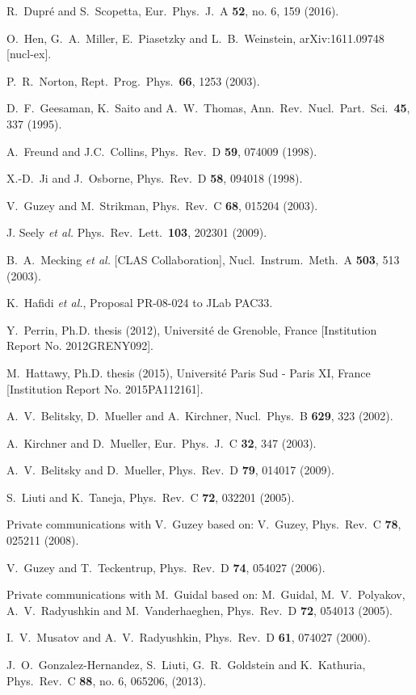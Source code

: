 \documentclass[twocolumn,nofootinbib,showpacs,prl,superscriptaddress,secnumarabic,amssymb,nobibnotes,aps,floatfix]{revtex4}
\begin{document}
\begin{thebibliography}{99}
  R.~Dupr\'e and S.~Scopetta,
  Eur.\ Phys.\ J.\ A {\bf 52}, no. 6, 159 (2016).

  O.~Hen, G.~A.~Miller, E.~Piasetzky and L.~B.~Weinstein,
  arXiv:1611.09748 [nucl-ex].

  P.~R.~Norton,
  Rept.\ Prog.\ Phys.\  {\bf 66}, 1253 (2003).

  D.~F.~Geesaman, K.~Saito and A.~W.~Thomas,
  Ann.\ Rev.\ Nucl.\ Part.\ Sci.\  {\bf 45}, 337 (1995).

A.~Freund and J.C.~Collins, 
Phys.\ Rev.\ D {\bf 59}, 074009 (1998).

X.-D.~Ji and J.~Osborne, 
Phys.\ Rev.\ D {\bf 58}, 094018 (1998).

  V.~Guzey and M.~Strikman,
  Phys.\ Rev.\ C {\bf 68}, 015204 (2003).

J. Seely {\it et al.} 
Phys.\ Rev.\ Lett.\ {\bf 103}, 202301 (2009).

B.~A.~Mecking {\it et al.} [CLAS Collaboration],
   Nucl.\ Instrum.\ Meth.\ A {\bf 503}, 513 (2003).

   K.~Hafidi {\it et al.},
   Proposal PR-08-024 to JLab PAC33.

Y.~Perrin, Ph.D. thesis (2012), Universit{\'e} de Grenoble, France
[Institution Report No. 2012GRENY092].

M.~Hattawy, Ph.D. thesis (2015), Universit{\'e} Paris Sud - Paris XI, France 
[Institution Report No. 2015PA112161].

A.~V.~Belitsky, D.~Mueller and A.~Kirchner,
Nucl.\ Phys.\ B {\bf 629}, 323 (2002).

A.~Kirchner and D.~Mueller, 
Eur.\ Phys.\ J.\ C {\bf 32}, 347 (2003).

A.~V.~Belitsky and D.~Mueller,
Phys.\ Rev.\ D {\bf 79}, 014017 (2009).

S.~Liuti and K.~Taneja, 
Phys.\ Rev.\ C {\bf 72}, 032201 (2005).

Private communications with V.~Guzey based on: 
V.~Guzey, Phys.\ Rev.\ C {\bf 78}, 025211 (2008).

V.~Guzey and T.~Teckentrup,
Phys.\ Rev.\ D {\bf 74}, 054027 (2006).

Private communications with M.~Guidal based on: 
M.~Guidal, M.~V.~Polyakov, A.~V.~Radyushkin and M.~Vanderhaeghen, 
Phys.\ Rev.\ D {\bf 72}, 054013 (2005).

I.~V.~Musatov and A.~V.~Radyushkin, 
Phys.\ Rev.\ D {\bf 61}, 074027 (2000).

J.~O.~Gonzalez-Hernandez, S.~Liuti, G.~R.~Goldstein and K.~Kathuria,
Phys.\ Rev.\ C {\bf 88}, no. 6, 065206, (2013).

\end{thebibliography}
\end{document}
